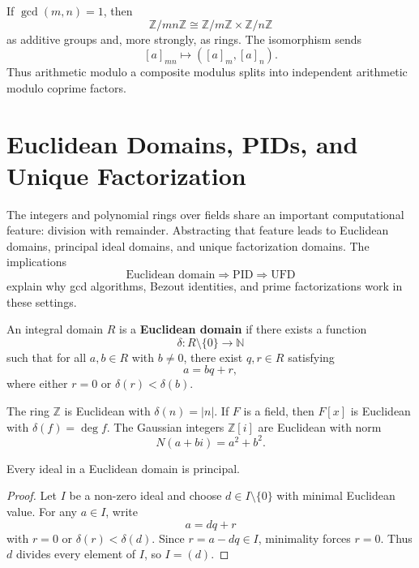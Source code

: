 \begin{example}
If $\gcd(m,n)=1$, then
\[
    \mathbb{Z}/mn\mathbb{Z}
    \cong
    \mathbb{Z}/m\mathbb{Z}\times\mathbb{Z}/n\mathbb{Z}
\]
as additive groups and, more strongly, as rings. The isomorphism sends
\[
    [a]_{mn}\longmapsto([a]_m,[a]_n).
\]
Thus arithmetic modulo a composite modulus splits into independent arithmetic modulo coprime factors.
\end{example}

\section{Euclidean Domains, PIDs, and Unique Factorization}

The integers and polynomial rings over fields share an important computational feature: division with remainder. Abstracting that feature leads to Euclidean domains, principal ideal domains, and unique factorization domains. The implications
\[
    \text{Euclidean domain}\Longrightarrow\text{PID}\Longrightarrow\text{UFD}
\]
explain why gcd algorithms, Bezout identities, and prime factorizations work in these settings.

\begin{definition}
An integral domain $R$ is a \textbf{Euclidean domain} if there exists a function
\[
    \delta:R\setminus\{0\}\to\mathbb{N}
\]
such that for all $a,b\in R$ with $b\neq0$, there exist $q,r\in R$ satisfying
\[
    a=bq+r,
\]
where either $r=0$ or $\delta(r)<\delta(b)$.
\end{definition}

\begin{example}
The ring $\mathbb{Z}$ is Euclidean with $\delta(n)=|n|$. If $F$ is a field, then $F[x]$ is Euclidean with $\delta(f)=\deg f$. The Gaussian integers $\mathbb{Z}[i]$ are Euclidean with norm
\[
    N(a+bi)=a^2+b^2.
\]
\end{example}

\begin{theorem}
Every ideal in a Euclidean domain is principal.
\end{theorem}

\begin{proof}
Let $I$ be a non-zero ideal and choose $d\in I\setminus\{0\}$ with minimal Euclidean value. For any $a\in I$, write
\[
    a=dq+r
\]
with $r=0$ or $\delta(r)<\delta(d)$. Since $r=a-dq\in I$, minimality forces $r=0$. Thus $d$ divides every element of $I$, so $I=(d)$.
\end{proof}

